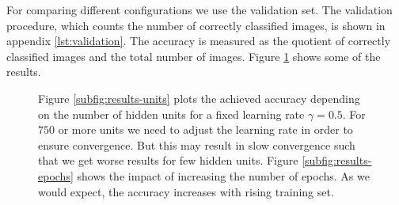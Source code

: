 For comparing different configurations we use the validation set. The validation procedure, which counts the number of correctly classified images, is shown in appendix \ref{lst:validation}. The accuracy is measured as the quotient of correctly classified images and the total number of images. Figure \ref{fig:results} shows some of the results.

\begin{figure}[t!]
	\centering
	\caption[Results of training a two-layer perceptron using the MNIST dataset.]{Figure \ref{subfig:results-units} plots the achieved accuracy depending on the number of hidden units for a fixed learning rate $\gamma = 0.5$. For $750$ or more units we need to adjust the learning rate in order to ensure convergence. But this may result in slow convergence such that we get worse results for few hidden units. Figure \ref{subfig:results-epochs} shows the impact of increasing the number of epochs. As we would expect, the accuracy increases with rising training set.}
	\label{fig:results}
\end{figure}
